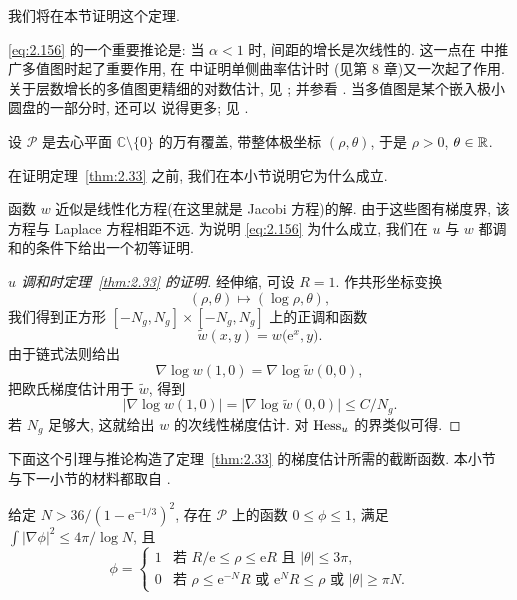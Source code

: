 我们将在本节证明这个定理.

\eqref{eq:2.156} 的一个重要推论是: 当 $\alpha<1$ 时, 间距的增长是次线性的. 这一点在
\cite{CM3} 中推广多值图时起了重要作用, 在 \cite{CM6} 中证明单侧曲率估计时
(见第 8 章)又一次起了作用. 关于层数增长的多值图更精细的对数估计, 见
\cite{CM8}; 并参看 \cite{CM29}. 当多值图是某个嵌入极小圆盘的一部分时, 还可以
说得更多; 见 \cite{CM8}.

设 $\mathcal{P}$ 是去心平面 $\mathbb{C}\setminus\{0\}$ 的万有覆盖, 带整体极坐标
$(\rho,\theta)$, 于是 $\rho>0$, $\theta\in\mathbb{R}$.

在证明定理~\ref{thm:2.33} 之前, 我们在本小节说明它为什么成立.

函数 $w$ 近似是线性化方程(在这里就是 Jacobi 方程)的解. 由于这些图有梯度界,
该方程与 Laplace 方程相距不远. 为说明 \eqref{eq:2.156} 为什么成立, 我们在 $u$ 与 $w$
都调和的条件下给出一个初等证明.

\begin{proof}[$u$ 调和时定理~\ref{thm:2.33} 的证明]
经伸缩, 可设 $R=1$. 作共形坐标变换
\begin{equation}
(\rho,\theta)\mapsto(\log\rho,\theta),
\label{eq:2.157}
\end{equation}
我们得到正方形 $[-N_g,N_g]\times[-N_g,N_g]$ 上的正调和函数
\begin{equation}
\tilde w(x,y)=w\bigl(\mathrm{e}^{x},y\bigr).
\label{eq:2.158}
\end{equation}
由于链式法则给出
\begin{equation}
\nabla\log w(1,0)=\nabla\log\tilde w(0,0),
\label{eq:2.159}
\end{equation}
把欧氏梯度估计用于 $\tilde w$, 得到
\begin{equation}
\bigl|\nabla\log w(1,0)\bigr|
 =\bigl|\nabla\log\tilde w(0,0)\bigr|\leq C/N_g.
\label{eq:2.160}
\end{equation}
若 $N_g$ 足够大, 这就给出 $w$ 的次线性梯度估计. 对 $\operatorname{Hess}_u$ 的界类似可得.
\end{proof}

下面这个引理与推论构造了定理~\ref{thm:2.33} 的梯度估计所需的截断函数. 本小节
与下一小节的材料都取自 \cite{CM3}.

\begin{lemma}
\label{lem:2.34}
给定 $N>36/(1-\mathrm{e}^{-1/3})^{2}$, 存在 $\mathcal{P}$ 上的函数
$0\leq\phi\leq1$, 满足 $\int|\nabla\phi|^{2}\leq4\pi/\log N$, 且
\begin{equation}
\phi=\begin{cases}
1 & \text{若 } R/\mathrm{e}\leq\rho\leq\mathrm{e}R
 \text{ 且 } |\theta|\leq3\pi,\\
0 & \text{若 } \rho\leq\mathrm{e}^{-N}R
 \text{ 或 } \mathrm{e}^{N}R\leq\rho
 \text{ 或 } |\theta|\geq\pi N.
\end{cases}
\label{eq:2.161}
\end{equation}
\end{lemma}

